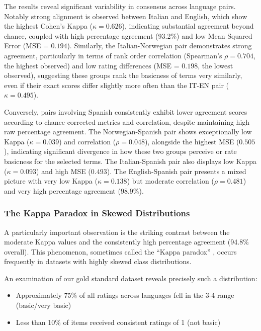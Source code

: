 \documentclass[preprint,12pt,authoryear]{elsarticle}
\begin{document}
The results reveal significant variability in consensus across language pairs. Notably strong alignment is observed between Italian and English, which show the highest Cohen's Kappa ($\kappa = 0.626$), indicating substantial agreement beyond chance, coupled with high percentage agreement (93.2\%) and low Mean Squared Error (MSE = $0.194$). Similarly, the Italian-Norwegian pair demonstrates strong agreement, particularly in terms of rank order correlation (Spearman's $\rho = 0.704$, the highest observed) and low rating differences (MSE = $0.198$, the lowest observed), suggesting these groups rank the basicness of terms very similarly, even if their exact scores differ slightly more often than the IT-EN pair ($\kappa=0.495$).

Conversely, pairs involving Spanish consistently exhibit lower agreement scores according to chance-corrected metrics and correlation, despite maintaining high raw percentage agreement. The Norwegian-Spanish pair shows exceptionally low Kappa ($\kappa = 0.039$) and correlation ($\rho = 0.048$), alongside the highest MSE ($0.505$), indicating significant divergence in how these two groups perceive or rate basicness for the selected terms. The Italian-Spanish pair also displays low Kappa ($\kappa = 0.093$) and high MSE ($0.493$). The English-Spanish pair presents a mixed picture with very low Kappa ($\kappa = 0.138$) but moderate correlation ($\rho = 0.481$) and very high percentage agreement (98.9\%).

\subsubsection{The Kappa Paradox in Skewed Distributions}
\label{sec:kappa_paradox}

A particularly important observation is the striking contrast between the moderate Kappa values and the consistently high percentage agreement (94.8\% overall). This phenomenon, sometimes called the ``Kappa paradox'' \citep{feinstein_high_1990,cicchetti_high_1990}, occurs frequently in datasets with highly skewed class distributions.

An examination of our gold standard dataset reveals precisely such a distribution:
\begin{itemize}
\item Approximately 75\% of all ratings across languages fell in the 3-4 range (basic/very basic)
\item Less than 10\% of items received consistent ratings of 1 (not basic)
\end{itemize}
\end{document}
